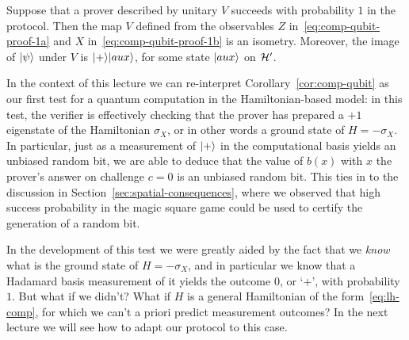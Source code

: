 \begin{corollary}\label{cor:comp-qubit}
Suppose that a prover described by unitary $V$ succeeds with probability $1$ in the protocol. Then the map $V$ defined from the observables  $Z$ in~\eqref{eq:comp-qubit-proof-1a} and $X$ in~\eqref{eq:comp-qubit-proof-1b} is an isometry. Moreover, the image of $|\psi\rangle$ under $V$ is $|+\rangle|aux\rangle$, for some state $|aux\rangle$ on $\mathcal{H}'$.
\end{corollary}

In the context of this lecture we can re-interpret Corollary~\ref{cor:comp-qubit} as our first test for a quantum computation in the Hamiltonian-based model: in this test, the verifier is effectively checking that the prover has prepared a $+1$ eigenstate of the Hamiltonian $\sigma_X$, or in other words a ground state of $H=-\sigma_X$. In particular, just as a measurement of $|+\rangle$ in the computational basis yields an unbiased random bit, we are able to deduce that the value of $b(x)$ with $x$ the prover's answer on challenge $c=0$ is an unbiased random bit. This ties in to the discussion in Section~\ref{sec:spatial-consequences}, where we observed that high success probability in the magic square game could be used to certify the generation of a random bit. 

In the development of this test we were greatly aided by the fact that we \emph{know} what is the ground state of $H = -\sigma_X$, and in particular we know that a Hadamard basis measurement of it yields the outcome $0$, or `$+$', with probability $1$. But what if we didn't? What if $H$ is a general Hamiltonian of the form~\eqref{eq:lh-comp}, for which we can't a priori predict measurement outcomes? In the next lecture we will see how to adapt our protocol to this case. 


